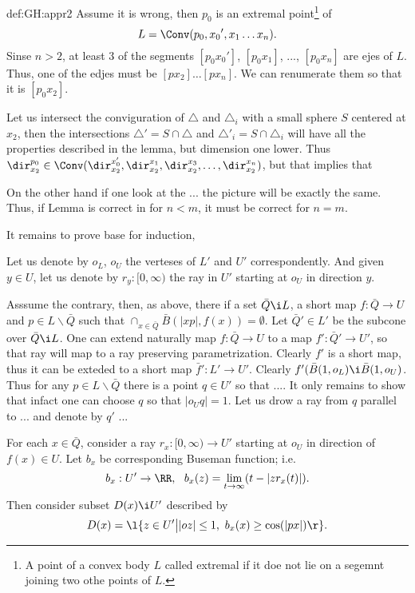 {\begin{subthm}{def:GH:appr2}
 Assume it is wrong, then $p_0$ is an extremal point\footnote{A point of a convex body $L$  called extremal if it doe not lie on a segemnt joining two othe points of $L$.} of
$$L=\Conv(p_0,{x_0}',{x_1}\dots{x_n}).$$
Sinse $n>2$, at least $3$ of the segments $[p_0x_0']$, $[p_0x_1]$, ..., $[p_0x_n]$ are ejes of $L$. 
Thus, one of the edjes must be $[p{x_2}]\dots[p{x_n}]$.
We can renumerate them so that it is $[{p_0}{x_2}]$.

Let us intersect the conviguration of $\triangle$ and $\triangle_i$ with a small sphere $S$ centered at $x_2$, then the intersections $\triangle'=S\cap \triangle$ and $\triangle'_i=S\cap \triangle_i$ will have all the properties described in the lemma, but dimension one lower.
Thus $\dir_{x_2}^{p_0}\in \Conv(\dir_{x_2}^{x_0'},\dir_{x_2}^{x_1},\dir_{x_2}^{x_3},\dots,\dir_{x_2}^{x_n})$, but that implies that 

On the other hand if one look at the ... the picture will be exactly the same.
Thus, if Lemma is correct in for $n<m$, it must be correct for $n=m$.

It remains to prove base for induction,
\qeds















Let us denote by $o_L$, $o_U$ the verteses of $L'$ and $U'$ correspondently.
And given $y\in U$, let us denote by $r_y:[0,\infty)$ the ray in $U'$ starting at $o_U$ in direction $y$.

Asssume the contrary, then, as above, 
there if a set $\bar Q\i L$, 
a short map $f:\bar Q\to U$ and  
$p\in L\backslash \bar Q$ such that 
$\cap_{x\in \bar Q}\bar B(|xp|,f(x))=\emptyset$.
Let $\bar Q'\in L'$ be the subcone over $\bar Q\i L$.
One can extend naturally map $f:\bar Q\to U$ to a map $f':\bar Q'\to U'$, so that ray will map to a ray preserving parametrization.
Clearly $f'$ is a short map, thus it can be exteded to a short map $\bar f':L'\to U'$.
Clearly $f'(\bar B(1,o_L)\i \bar B(1,o_U)$.
Thus for any $p\in L\backslash \bar Q$ there is a point $q\in U'$ 
so that $...$.
It only remains to show that infact one can choose $q$ so that $|o_Uq|=1$.
Let us drow a ray from $q$ parallel to ... and denote by $q'$ ...

For each $x\in \bar Q$, consider a ray $r_x:[0,\infty)\to U'$ starting at $o_U$ in direction of $f(x)\in U$.
Let $b_x$ be corresponding Buseman function; i.e.
$$b_x:U'\to\RR,\ \ b_x(z)=\lim_{t\to\infty}(t-|zr_x(t)|).$$
Then consider subset $D(x)\i U'$ described by
$$D(x)=\l\{z\in U'{\big\vert}|oz|\le 1,\ b_x(x)\ge \cos(|px|)\r\}.$$


\end{subthm}}
